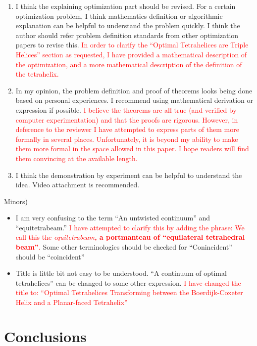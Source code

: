 \documentclass{article}
\newcommand{\highlighttext}[1] {\textcolor{red}{#1}}
\begin{document}
\begin{enumerate}
  \item
    I think the explaining optimization part should be revised. For a certain optimization problem, I think mathematics definition or algorithmic explanation can be helpful to understand the problem quickly. I think the author should refer problem definition standards from other optimization papers to revise this.
    \highlighttext{
      In order to clarify the ``Optimal Tetrahelices are Triple Helices'' section as requested,
      I have provided a mathematical description of the optimization, and a more mathematical
      description of the definition of the tetrahelix.
      }


  \item    
    In my opinion, the problem definition and proof of theorems looks being done based on personal experiences. I recommend using mathematical derivation or expression if possible.
    \highlighttext{
      I believe the theorems are all true (and verified by computer experimentation) and that the proofs
      are rigorous. However, in deference to the reviewer I have attempted to express parts of them
      more formally in several places. Unfortunately, it is beyond my ability to make them more formal
      in the space allowed in this paper. I hope readers will find them convincing at the available length.
      }

  \item    
 I think the demonstration by experiment can be helpful to understand the idea. Video attachment is recommended. 

\end{enumerate}

Minors)

\begin{itemize}
  \item
    I am very confusing to the term “An untwisted continuum” and “equitetrabeam.”
    \highlighttext{I have attempted to clarify this by adding the phrase:
      We call this the \emph{equitetrabeam}\textbf{, a portmanteau of ``equilateral tetrahedral beam''}.}
    Some other terminologies should be checked for 
“Conincident” should be “coincident”
\item
  Title is little bit not easy to be understood. “A continuum of optimal tetrahelices” can be changed to some other expression.
  \highlighttext{
    I have changed the title to:
 ``Optimal Tetrahelices Transforming between the Boerdijk-Coxeter Helix and a Planar-faced Tetrahelix''
}
\end{itemize}


\section{Conclusions}\label{conclusions}



\end{document}
